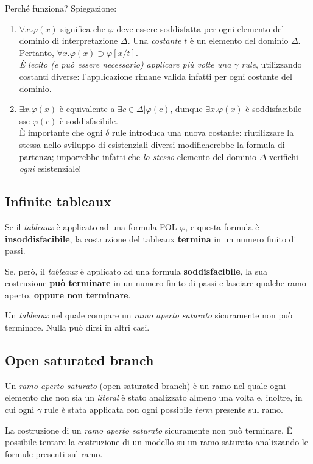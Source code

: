 Perché funziona? Spiegazione:
\begin{enumerate}
\item $\forall x . \varphi(x)$ significa che $\varphi$ deve essere soddisfatta per ogni elemento del dominio di interpretazione $\Delta$. Una \textit{costante} $t$ è un elemento del dominio $\Delta$. Pertanto, $\forall x. \varphi(x) \supset \varphi[x/t]$.\\\textit{È lecito (e può essere necessario) applicare più volte una $\gamma$ rule}, utilizzando costanti diverse: l'applicazione rimane valida infatti per ogni costante del dominio.
\item $\exists x. \varphi(x)$ è equivalente a $\exists c \in \Delta | \varphi(c)$, dunque $\exists x. \varphi(x)$ è soddisfacibile sse $\varphi(c)$ è soddisfacibile.\\È importante che ogni $\delta$ rule introduca una nuova costante: riutilizzare la stessa nello sviluppo di esistenziali diversi modificherebbe la formula di partenza; imporrebbe infatti che \textit{lo stesso} elemento del dominio $\Delta$ verifichi \textit{ogni} esistenziale!
\end{enumerate}

\vspace{1em}

\subsection{Infinite tableaux}
Se il \textit{tableaux} è applicato ad una formula FOL $\varphi$, e questa formula è \textbf{insoddisfacibile}, la costruzione del tableaux \textbf{termina} in un numero finito di passi.

Se, però, il \textit{tableaux} è applicato ad una formula \textbf{soddisfacibile}, la sua costruzione \textbf{può terminare} in un numero finito di passi e lasciare qualche ramo aperto, \textbf{oppure non terminare}.

Un \textit{tableaux} nel quale compare un \textit{ramo aperto saturato} sicuramente non può terminare. Nulla può dirsi in altri casi.

\subsection{Open saturated branch}
Un \textit{ramo aperto saturato} (open saturated branch) è un ramo nel quale ogni elemento che non sia un \textit{literal} è stato analizzato almeno una volta e, inoltre, in cui ogni $\gamma$ rule è stata applicata con ogni possibile \textit{term} presente sul ramo.

La costruzione di un \textit{ramo aperto saturato} sicuramente non può terminare. È possibile tentare la costruzione di un modello su un ramo saturato analizzando le formule presenti sul ramo.